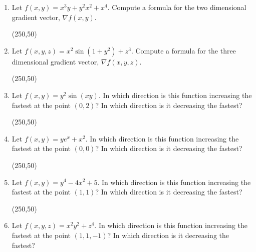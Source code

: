 \documentclass[12pt]{article}
\begin{document}


\setcounter{page}{2}
\begin{enumerate}[label=\arabic*.,start=2,leftmargin=*,itemsep=0pt]

\item Let $f(x,y)=x^3y+y^2x^2+x^4$. Compute a formula for the two dimensional
gradient vector, $\nabla f(x,y)$.

\vfill
\begin{flushright}
\framebox(250,50){}
\end{flushright}

\item Let $f(x,y,z)=x^2\sin(1+y^2)+z^3$. Compute a formula for the three
dimensional gradient vector, $\nabla f(x,y,z)$.

\vfill
\begin{flushright}
\framebox(250,50){}
\end{flushright}

\newpage

\item Let $f(x,y)=y^2\sin(xy)$. In which direction is this function increasing
the fastest at the point $(0,2)$? In which direction is it decreasing the
fastest?

\vfill
\begin{flushright}
\framebox(250,50){}
\end{flushright}

\item Let $f(x,y)=ye^x+x^2$. In which direction is this function increasing
the fastest at the point $(0,0)$? In which direction is it decreasing the
fastest?

\vfill
\begin{flushright}
\framebox(250,50){}
\end{flushright}

\newpage

\item Let $f(x,y)=y^4-4x^2+5$. In which direction is this function increasing
the fastest at the point $(1,1)$? In which direction is it decreasing the
fastest?

\vfill
\begin{flushright}
\framebox(250,50){}
\end{flushright}

\item Let $f(x,y,z)=x^2y^2+z^4$. In which direction is this function
increasing the fastest at the point $(1,1,-1)$? In which direction is it
decreasing the fastest?


\end{enumerate}
\end{document}
